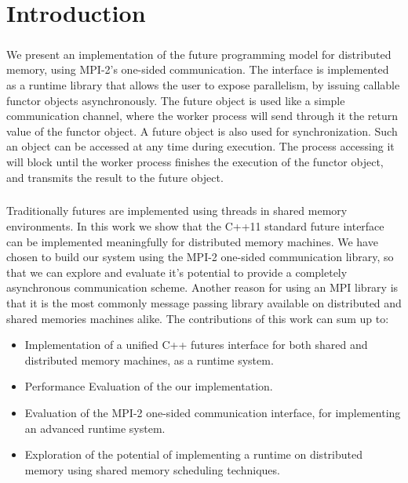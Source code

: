 \chapter*{Introduction}

\paragraph{}
We present an implementation of the future programming model for distributed memory,
using MPI-2's one-sided communication.  The interface is implemented as a runtime 
library that allows the user to  expose parallelism, by issuing callable functor objects 
asynchronously.  The future object is used like a simple communication channel, where the worker process 
will send through it the return value of the functor object. 
A future object is also used for synchronization. Such an object can be accessed at any time during execution.
The process accessing it will block until the worker process finishes the execution of the functor object, and
transmits the result to the future object.

\paragraph{}
Traditionally futures are implemented using threads in shared memory environments.  
In this work we show that the C++11 standard future interface~\cite{CPP:Threads} can be implemented meaningfully 
for distributed memory machines.  We have chosen to build our system using the MPI-2 one-sided
communication library, so that we can explore and evaluate it's potential to provide a completely asynchronous
communication scheme.  Another reason for using an MPI library is that it is the most commonly message passing
library available on distributed and shared memories machines alike.  
The contributions of this work can sum up to:
\\
\begin{itemize}
	\item Implementation of a unified C++ futures interface for both shared and distributed memory machines, as a runtime system.
	\item Performance Evaluation of the our implementation. 
	\item Evaluation of the MPI-2 one-sided communication interface, for implementing an advanced runtime system.
	\item Exploration of the potential of implementing a runtime on distributed memory using shared memory scheduling techniques.
\end{itemize}

